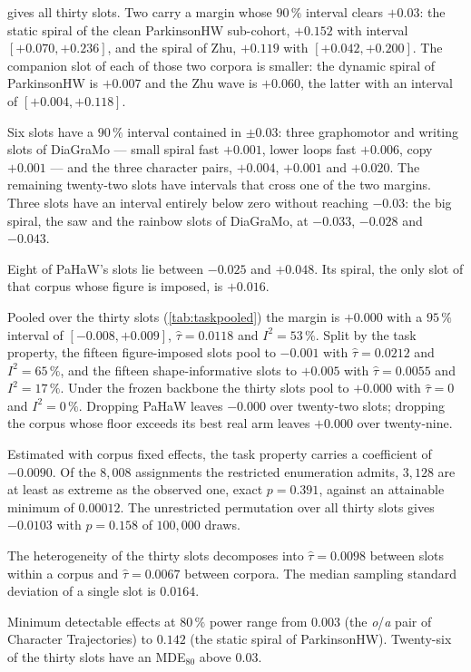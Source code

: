  gives all thirty slots. Two carry a margin whose $90\,\%$ interval clears
$+0.03$: the static spiral of the clean ParkinsonHW sub-cohort, $+0.152$ with interval
$[+0.070, +0.236]$, and the spiral of Zhu, $+0.119$ with $[+0.042, +0.200]$. The companion slot of
each of those two corpora is smaller: the dynamic spiral of ParkinsonHW is $+0.007$ and the Zhu wave
is $+0.060$, the latter with an interval of $[+0.004, +0.118]$.

Six slots have a $90\,\%$ interval contained in $\pm 0.03$: three graphomotor and writing slots of
DiaGraMo --- small spiral fast $+0.001$, lower loops fast $+0.006$, copy $+0.001$ --- and the three
character pairs, $+0.004$, $+0.001$ and $+0.020$. The remaining twenty-two slots have intervals that
cross one of the two margins. Three slots have an interval entirely below zero without reaching
$-0.03$: the big spiral, the saw and the rainbow slots of DiaGraMo, at $-0.033$, $-0.028$ and
$-0.043$.

Eight of PaHaW's slots lie between $-0.025$ and $+0.048$. Its spiral, the only slot of that corpus
whose figure is imposed, is $+0.016$.

Pooled over the thirty slots (\cref{tab:taskpooled}) the margin is $+0.000$ with a $95\,\%$ interval
of $[-0.008, +0.009]$, $\hat\tau = 0.0118$ and $I^2 = 53\,\%$. Split by the task property, the
fifteen figure-imposed slots pool to $-0.001$ with $\hat\tau = 0.0212$ and $I^2 = 65\,\%$, and the
fifteen shape-informative slots to $+0.005$ with $\hat\tau = 0.0055$ and $I^2 = 17\,\%$. Under the
frozen backbone the thirty slots pool to $+0.000$ with $\hat\tau = 0$ and $I^2 = 0\,\%$. Dropping
PaHaW leaves $-0.000$ over twenty-two slots; dropping the corpus whose floor exceeds its best real
arm leaves $+0.000$ over twenty-nine.

Estimated with corpus fixed effects, the task property carries a coefficient of $-0.0090$. Of the
$8{,}008$ assignments the restricted enumeration admits, $3{,}128$ are at least as extreme as the
observed one, exact $p = 0.391$, against an attainable minimum of $0.00012$. The unrestricted
permutation over all thirty slots gives $-0.0103$ with $p = 0.158$ of $100{,}000$ draws.

The heterogeneity of the thirty slots decomposes into $\hat\tau = 0.0098$ between slots within a
corpus and $\hat\tau = 0.0067$ between corpora. The median sampling standard deviation of a single
slot is $0.0164$.

Minimum detectable effects at $80\,\%$ power range from $0.003$ (the \textit{o}/\textit{a} pair of
Character Trajectories) to $0.142$ (the static spiral of ParkinsonHW). Twenty-six of the thirty
slots have an MDE$_{80}$ above $0.03$.

